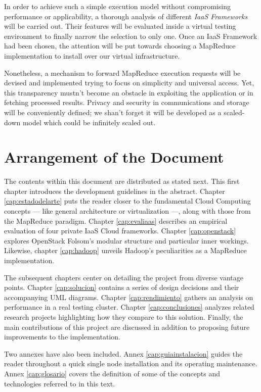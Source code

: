In order to achieve such a simple execution model without compromising performance or applicability, a thorough analysis of different \emph{IaaS Frameworks} will be carried out. Their features will be evaluated inside a virtual testing environment to finally narrow the selection to only one. Once an IaaS Framework had been chosen, the attention will be put towards choosing a MapReduce implementation to install over our virtual infrastructure.

Nonetheless, a mechanism to forward MapReduce execution requests will be devised and implemented trying to focus on simplicity and universal access. Yet, this transparency mustn't become an obstacle in exploiting the application or in fetching processed results. Privacy and security in communications and storage will be conveniently defined; we shan't forget it will be developed as a scaled-down model which could be infinitely scaled out.

\section{Arrangement of the Document}\label{sec:organizacion}
\noindent The contents within this document are distributed as stated next. This first chapter introduces the development guidelines in the abstract. Chapter \ref{cap:estadodelarte} puts the reader closer to the fundamental Cloud Computing concepts --- like general architecture or virtualization ---, along with those from the MapReduce paradigm. Chapter \ref{cap:evaliaas} describes an empirical evaluation of four private IaaS Cloud frameworks. Chapter \ref{cap:openstack} explores OpenStack Folsom's modular structure and particular inner workings. Likewise, chapter \ref{cap:hadoop} unveils Hadoop's peculiarities as a MapReduce implementation.

The subsequent chapters center on detailing the project from diverse vantage points. Chapter \ref{cap:solucion} contains a series of design decisions and their accompanying UML diagrams. Chapter \ref{cap:rendimiento} gathers an analysis on performance in a real testing cluster. Chapter \ref{cap:conclusiones} analyzes related research projects highlighting how they compare to this solution. Finally, the main contributions of this project are discussed in addition to proposing future improvements to the implementation.

Two annexes have also been included. Annex \ref{cap:guiainstalacion} guides the reader throughout a quick single node installation and its operating maintenance. Annex \ref{cap:glosario} covers the definition of some of the concepts and technologies referred to in this text.

